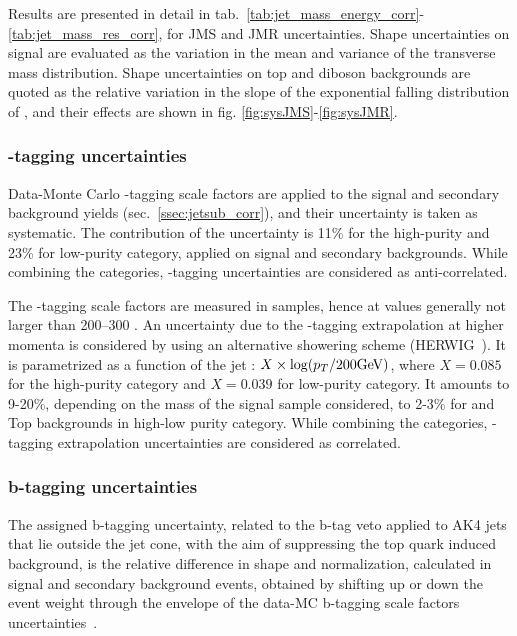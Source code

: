 \noindent Results are presented in detail in tab.~\ref{tab:jet_mass_energy_corr}-\ref{tab:jet_mass_res_corr}, for JMS and JMR uncertainties. Shape uncertainties on signal are evaluated as the variation in the mean and variance of the transverse mass distribution. Shape uncertainties on top and diboson backgrounds are quoted as the relative variation in the slope of the exponential falling distribution of \mtVZ, and their effects are shown in fig. \ref{fig:sysJMS}-\ref{fig:sysJMR}.


\subsubsection{\V-tagging uncertainties}
\label{sec:wtagunc}

Data-Monte Carlo \V-tagging scale factors are applied to the signal and secondary background yields (sec.~\ref{ssec:jetsub_corr}), and their uncertainty is taken as systematic. The contribution of the uncertainty is 11\% for the high-purity and 23\% for low-purity category, applied on signal and secondary backgrounds. While combining the categories, \V-tagging uncertainties are considered as anti-correlated.

\noindent The \V-tagging scale factors are measured in \ttbar samples, hence at \pt values generally not larger than 200--300 \GeV. An uncertainty due to the \V-tagging extrapolation at higher momenta is considered by using an alternative showering scheme (HERWIG~\cite{bib:HERWIG}). It is parametrized as a function of the jet \pt: $X \times \log(p_T/200 \text{GeV})$, where $X=0.085$ for the high-purity category and $X=0.039$ for low-purity category. It amounts to 9-20\%, depending on the mass of the signal sample considered, to 2-3\% for \VV and Top backgrounds in high-low purity category. While combining the categories, \V-tagging extrapolation uncertainties are considered as correlated.


\subsubsection{b-tagging uncertainties}
\label{sec:btagunc}
The assigned b-tagging uncertainty, related to the b-tag veto applied to AK4 jets that lie outside the \V jet cone, with the aim of suppressing the top quark induced background, is the relative difference in shape and normalization, calculated in signal and secondary background events, obtained by shifting up or down the event weight through the envelope of the data-MC b-tagging scale factors uncertainties~\cite{bib:btagsf}.

